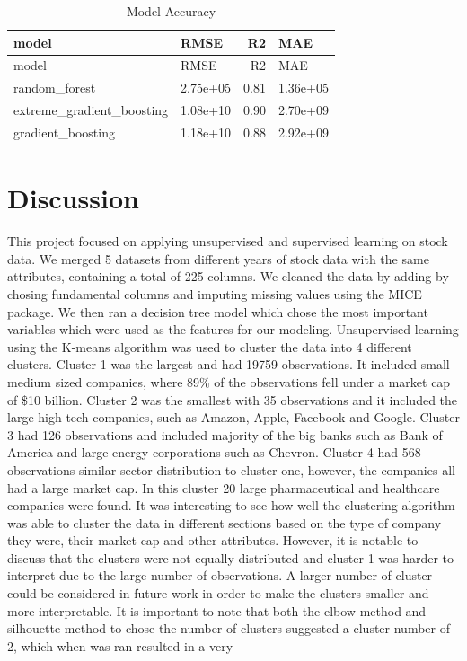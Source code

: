 \documentclass[11pt,]{article}
\begin{document}
\begin{longtable}[]{@{}llrl@{}}
\caption{Model Accuracy}\tabularnewline
\toprule
model & RMSE & R2 & MAE\tabularnewline
\midrule
\endfirsthead
\toprule
model & RMSE & R2 & MAE\tabularnewline
\midrule
\endhead
random\_forest & 2.75e+05 & 0.81 & 1.36e+05\tabularnewline
extreme\_gradient\_boosting & 1.08e+10 & 0.90 & 2.70e+09\tabularnewline
gradient\_boosting & 1.18e+10 & 0.88 & 2.92e+09\tabularnewline
\bottomrule
\end{longtable}

\hypertarget{discussion}{%
\section{Discussion}\label{discussion}}

This project focused on applying unsupervised and supervised learning on
stock data. We merged 5 datasets from different years of stock data with
the same attributes, containing a total of 225 columns. We cleaned the
data by adding by chosing fundamental columns and imputing missing
values using the MICE package. We then ran a decision tree model which
chose the most important variables which were used as the features for
our modeling. Unsupervised learning using the K-means algorithm was used
to cluster the data into 4 different clusters. Cluster 1 was the largest
and had 19759 observations. It included small-medium sized companies,
where 89\% of the observations fell under a market cap of \$10 billion.
Cluster 2 was the smallest with 35 observations and it included the
large high-tech companies, such as Amazon, Apple, Facebook and Google.
Cluster 3 had 126 observations and included majority of the big banks
such as Bank of America and large energy corporations such as Chevron.
Cluster 4 had 568 observations similar sector distribution to cluster
one, however, the companies all had a large market cap. In this cluster
20 large pharmaceutical and healthcare companies were found. It was
interesting to see how well the clustering algorithm was able to cluster
the data in different sections based on the type of company they were,
their market cap and other attributes. However, it is notable to discuss
that the clusters were not equally distributed and cluster 1 was harder
to interpret due to the large number of observations. A larger number of
cluster could be considered in future work in order to make the clusters
smaller and more interpretable. It is important to note that both the
elbow method and silhouette method to chose the number of clusters
suggested a cluster number of 2, which when was ran resulted in a very
\end{document}
